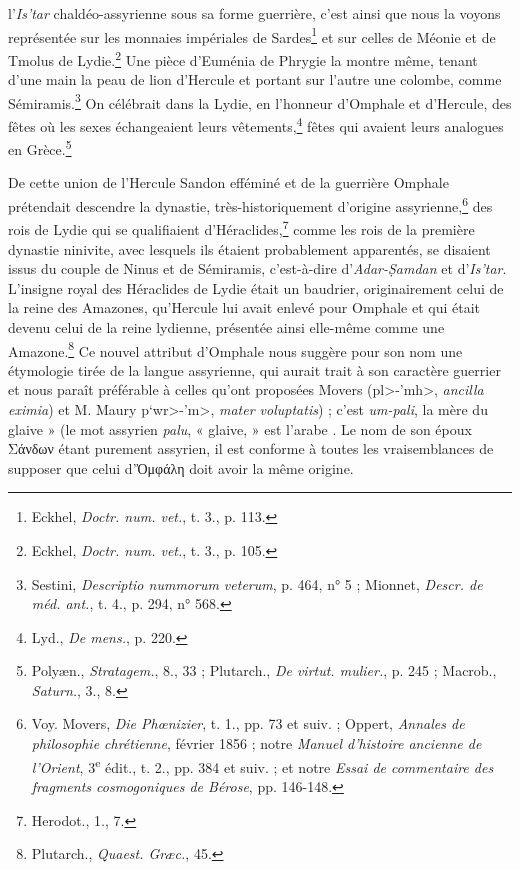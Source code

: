 \documentclass[a4paper, 11pt, oneside, landscape]{article}
\newcommand*\svgAAAJ{}
\begin{document}
l'\emph{Is'tar} chaldéo-assyrienne sous sa forme guerrière, c'est ainsi que nous la voyons représentée sur les monnaies impériales de Sardes\footnote{Eckhel, \emph{Doctr. num. vet.}, t. 3., p. 113.} et sur celles de Méonie et de Tmolus de Lydie.\footnote{Eckhel, \emph{Doctr. num. vet.}, t. 3., p. 105.} Une pièce d'Euménia de Phrygie la montre même, tenant d'une main la peau de lion d'Hercule et portant sur l'autre une colombe, comme Sémiramis.\footnote{Sestini, \emph{Descriptio nummorum veterum}, p. 464, n° 5 ; Mionnet, \emph{Descr. de méd. ant.}, t. 4., p. 294, n° 568.} On célébrait dans la Lydie, en l'honneur d'Omphale et d'Hercule, des fêtes où les sexes échangeaient leurs vêtements,\footnote{Lyd., \emph{De mens.}, p. 220.} fêtes qui avaient leurs analogues en Grèce.\footnote{Polyæn., \emph{Stratagem.}, 8., 33 ; Plutarch., \emph{De virtut. mulier.}, p. 245 ; Macrob., \emph{Saturn.}, 3., 8.}

De cette union de l'Hercule Sandon efféminé et de la guerrière Omphale prétendait descendre la dynastie, très-historiquement d'origine assyrienne,\footnote{Voy. Movers, \emph{Die Phœnizier}, t. 1., pp. 73 et suiv. ; Oppert, \emph{Annales de philosophie chrétienne}, février 1856 ; notre \emph{Manuel d'histoire ancienne de l'Orient}, 3\textsuperscript{e} édit., t. 2., pp. 384 et suiv. ; et notre \emph{Essai de commentaire des fragments cosmogoniques de Bérose}, pp. 146-148.} des rois de Lydie qui se qualifiaient d'Héraclides,\footnote{Herodot., 1., 7.} comme les rois de la première dynastie ninivite, avec lesquels ils étaient probablement apparentés, se disaient issus du couple de Ninus et de Sémiramis, c'est-à-dire d'\emph{Adar-\d{S}amdan} et d'\emph{Is'tar}. L'insigne royal des Héraclides de Lydie était un baudrier, originairement celui de la reine des Amazones, qu'Hercule lui avait enlevé pour Omphale et qui était devenu celui de la reine lydienne, présentée ainsi elle-même comme une Amazone.\footnote{Plutarch., \emph{Quaest. Græc.}, 45.} Ce nouvel attribut d'Omphale nous suggère pour son nom une étymologie tirée de la langue assyrienne, qui aurait trait à son caractère guerrier et nous paraît préférable à celles qu'ont proposées Movers (\<pl>-\<'mh>, \emph{ancilla eximia}) et M. Maury \<p`wr>-\<'m>, \emph{mater voluptatis}) ; c'est \emph{um-pali}, la mère du glaive » (le mot assyrien \emph{palu}, « glaive, » est l'arabe $\svgAAAJ$. Le nom de son époux Σάνδων étant purement assyrien, il est conforme à toutes les vraisemblances de supposer que celui d'Ὀμφάλη doit avoir la même origine.
\end{document}
